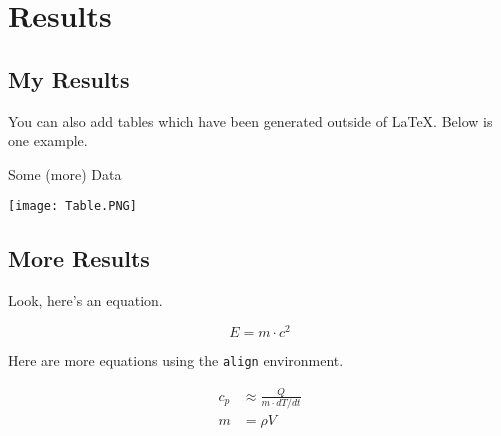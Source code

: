 \chapter{Results}
\label{ch:Results}

\section{My Results}

You can also add tables which have been generated outside of \LaTeX. Below is one example.

\begin{table}[h]
\centering
\caption{Some (more) Data}
\label{tab:more data}
\texttt{[image: Table.PNG]}
\end{table}

\section{More Results}

Look, here's an equation.

\begin{equation}
	E = m \cdot c^2
\end{equation}

Here are more equations using the \texttt{align} environment.

\begin{align}
	c_p &\approx \frac{Q}{m \cdot dT/dt} \\
	m &= \rho V
\end{align}

